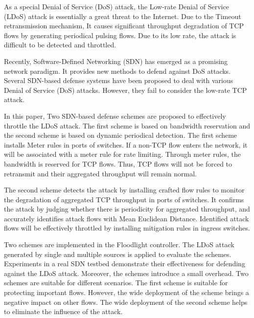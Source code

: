 \begin{eabstract}
  As a special Denial of Service (DoS) attack, the Low-rate Denial of Service (LDoS) attack is essentially a great threat to the Internet. Due to the Timeout retransmission mechanism, It causes significant throughput degradation of TCP flows by generating periodical pulsing flows. Due to its low rate, the attack is difficult to be detected and throttled.

  Recently, Software-Defined Networking (SDN) has emerged as a promising network paradigm. It provides new methods to defend against DoS attacks. Several SDN-based defense systems have been proposed to deal with various Denial of Service (DoS) attacks. However, they fail to consider the low-rate TCP attack.

  In this paper, Two SDN-based defense schemes are proposed to effectively throttle the LDoS attack. The first scheme is based on bandwidth reservation and the second scheme is based on dynamic periodical detection. The first scheme installs Meter rules in ports of switches. If a non-TCP flow enters the network, it will be associated with a meter rule for rate limiting. Through meter rules, the bandwidth is reserved for TCP flows. Thus, TCP flows will not be forced to retransmit and their aggregated throughput will remain normal. 


  The second scheme detects the attack by installing crafted flow rules to monitor the degradation of aggregated TCP throughput in ports of switches. It confirms the attack by judging whether there is periodicity for aggregated throughput, and accurately identifies attack flows with Mean Euclidean Distance. Identified attack flows will be effectively throttled by installing mitigation rules in ingress switches.

  Two schemes are implemented in the Floodlight controller. The LDoS attack generated by single and multiple sources is applied to evaluate the schemes. Experiments in a real SDN testbed demonstrate their effectiveness for defending against the LDoS attack. Moreover, the schemes introduce a small overhead. Two schemes are suitable for different scenarios. The first scheme is suitable for protecting important flows. However, the wide deployment of the scheme brings a negative impact on other flows. The wide deployment of the second scheme helps to eliminate the influence of the attack.

\end{eabstract}


